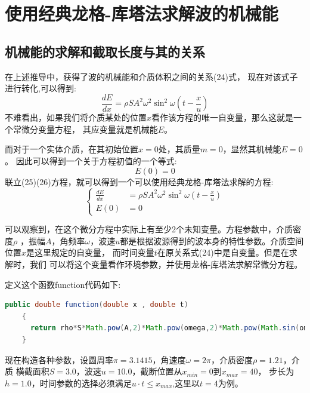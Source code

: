\documentclass[lang=cn,a4paper,newtx]{elegantpaper}
\begin{document}
\section{使用经典龙格-库塔法求解波的机械能}
  \subsection{机械能的求解和截取长度与其的关系}
    在上述推导中，获得了波的机械能和介质体积之间的关系(24)式，
  现在对该式子进行转化,可以得到:
  \begin{equation}
    \frac{dE}{dx}= \rho S A^2 \omega^2 \sin^2 \omega(t-\frac{x}{u})
  \end{equation}
  不难看出，如果我们将介质某处的位置$x$看作该方程的唯一自变量，那么这就是一个常微分变量方程，
其应变量就是机械能$E$。

  而对于一个实体介质，在其初始位置$x=0$处，其质量$m=0$，显然其机械能$E=0$。
  因此可以得到一个关于方程初值的一个等式:
  \begin{equation}
    E(0)=0
  \end{equation}
  联立(25)(26)方程，就可以得到一个可以使用经典龙格-库塔法求解的方程:
  \begin{equation}
    \left\{
    \begin{array}{ll}
      \frac{dE}{dx}&= \rho SA^2 \omega^2 \sin^2 \omega(t-\frac{x}{u})\\
      E(0)&=0
    \end{array}  
    \right.
  \end{equation}

  可以观察到，在这个微分方程中实际上有至少2个未知变量。方程参数中，介质密度$\rho$
  ，振幅$A$，角频率$\omega$，波速$u$都是根据波源得到的波本身的特性参数。介质空间位置$x$是这里规定的自变量，
  而时间变量$t$在原关系式(24)中是自变量。但是在求解时，我们
  可以将这个变量看作环境参数，并使用龙格-库塔法求解常微分方程。

  定义这个函数function代码如下:
  \begin{lstlisting}[language=java]
    public double function(double x , double t)
    {
      return rho*S*Math.pow(A,2)*Math.pow(omega,2)*Math.pow(Math.sin(omega*(t-x/u)),2);
    }
  \end{lstlisting}

现在构造各种参数，设圆周率$\pi=3.1415$，角速度$\omega=2\pi$，介质密度$\rho=1.21$，介质
横截面积$S=3.0$，波速$u=10.0$，截断位置从$x_{min}=0$到$x_{max}=40$，
步长为$h=1.0$，时间参数的选择必须满足$u\cdot t \leqslant x_{max}$,这里以$t=4$为例。
\end{document}
